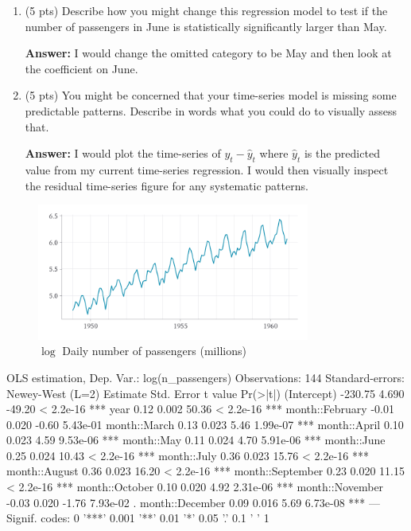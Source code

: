 \documentclass[12pt]{article}
\newcommand{\answer}[1]{{\color{blue_winged_teal}\textbf{Answer:} #1}}
\newcommand{\pts}[1]{{\color{zinc500}(#1 pts)}}
\begin{document}
\begin{enumerate}
\begin{enumerate}
    \item \pts{5} Describe how you might change this regression model to test if the number of passengers in June is statistically significantly larger than May.

    \answer{I would change the omitted category to be May and then look at the coefficient on June.}

    \item \pts{5} You might be concerned that your time-series model is missing some predictable patterns. Describe in words what you could do to visually assess that.

    \answer{
      I would plot the time-series of $y_t - \hat{y}_t$ where $\hat{y}_t$ is the predicted value from my current time-series regression.
      I would then visually inspect the residual time-series figure for any systematic patterns.
    }
  \end{enumerate}
\end{enumerate}

\newpage
\begin{figure}[h!]
  \caption{$\log$ Daily number of passengers (millions)}
  \label{fig:bitcoin}

  \vspace*{-2\bigskipamount}
  \begin{center}
  \includegraphics[width = 0.8\textwidth]{figures/log_n_passengers_airline.pdf}
  \end{center}
\end{figure}

\vspace*{-\bigskipamount}
\begin{codeblock}[{}]
OLS estimation, Dep. Var.: log(n_passengers)
Observations: 144
Standard-errors: Newey-West (L=2)
                  Estimate  Std. Error   t value   Pr(>|t|)
(Intercept)        -230.75       4.690    -49.20  < 2.2e-16 ***
year                  0.12       0.002     50.36  < 2.2e-16 ***
month::February      -0.01       0.020     -0.60   5.43e-01
month::March          0.13       0.023      5.46   1.99e-07 ***
month::April          0.10       0.023      4.59   9.53e-06 ***
month::May            0.11       0.024      4.70   5.91e-06 ***
month::June           0.25       0.024     10.43  < 2.2e-16 ***
month::July           0.36       0.023     15.76  < 2.2e-16 ***
month::August         0.36       0.023     16.20  < 2.2e-16 ***
month::September      0.23       0.020     11.15  < 2.2e-16 ***
month::October        0.10       0.020      4.92   2.31e-06 ***
month::November      -0.03       0.020     -1.76   7.93e-02 .
month::December       0.09       0.016      5.69   6.73e-08 ***
---
Signif. codes:  0 '***' 0.001 '**' 0.01 '*' 0.05 '.' 0.1 ' ' 1
\end{codeblock}
\end{document}
